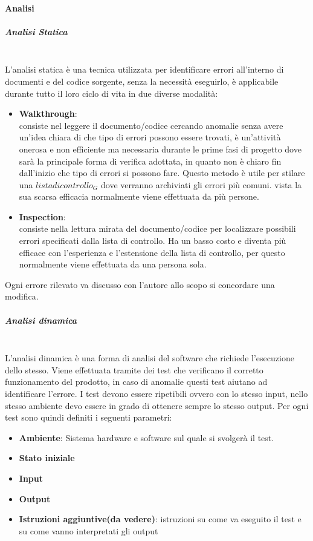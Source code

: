 		\paragraph{Analisi}
			\subparagraph{Analisi Statica} \mbox{} \\
			L'analisi statica è una tecnica utilizzata per identificare errori all'interno di documenti e del codice sorgente, senza la necessità eseguirlo, è applicabile durante tutto il loro ciclo di vita in due diverse modalità:
			\begin{itemize}
				\item \textbf{Walkthrough}: \mbox{} \\
				consiste nel leggere il documento/codice cercando anomalie senza avere un'idea chiara di che tipo di errori possono essere trovati, è un'attività onerosa e non efficiente ma necessaria durante le prime fasi di progetto dove sarà la principale forma di verifica adottata, in quanto non è chiaro fin dall'inizio che tipo di errori si possono fare.
				Questo metodo è utile per stilare una $lista di controllo_G$ dove verranno archiviati gli errori più comuni.
				vista la sua scarsa efficacia normalmente viene effettuata da più persone.
				\item \textbf{Inspection}: \mbox{} \\
				consiste nella lettura mirata del documento/codice per localizzare possibili errori specificati dalla lista di controllo. Ha un basso costo e diventa più efficace con l'esperienza e l'estensione della lista di controllo, per questo normalmente viene effettuata da una persona sola.
			\end{itemize}
		    Ogni errore rilevato va discusso con l'autore allo scopo si concordare una modifica.
			\subparagraph{Analisi dinamica} \mbox{} \\
			L'analisi dinamica è una forma di analisi del software che richiede l'esecuzione dello stesso. Viene effettuata tramite dei test che verificano il corretto funzionamento del prodotto, in caso di anomalie questi test aiutano ad identificare l'errore.
			I test devono essere ripetibili ovvero con lo stesso input, nello stesso ambiente devo essere in grado di ottenere sempre lo stesso output. Per ogni test sono quindi definiti i seguenti parametri:
			\begin{itemize}
				\item \textbf{Ambiente}: Sistema hardware e software sul quale si svolgerà il test.
				\item \textbf{Stato iniziale}
				\item \textbf{Input}
				\item \textbf{Output}
				\item \textbf{Istruzioni aggiuntive(da vedere)}: istruzioni su come va eseguito il test e su come vanno interpretati gli output
			\end{itemize}
